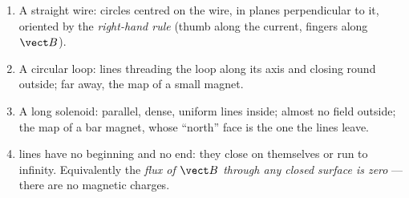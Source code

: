 \begin{proposition}\label{prop:b1:magnetostatics:maps}
\begin{enumerate}
  \item A straight wire: circles centred on the wire, in planes
        perpendicular to it, oriented by the \emph{right-hand rule}
        (thumb along the current, fingers along $\vect B$).
  \item A circular loop: lines threading the loop along its axis and
        closing round outside; far away, the map of a small magnet.
  \item A long solenoid: parallel, dense, uniform lines inside; almost
        no field outside; the map of a bar magnet, whose ``north'' face
        is the one the lines leave.
  \item {} lines have no beginning and no end: they close
        on themselves or run to infinity. Equivalently the \emph{flux of
        $\vect B$ through any closed surface is zero} --- there are no
        magnetic charges.
\end{enumerate}
\end{proposition}
\admitted

